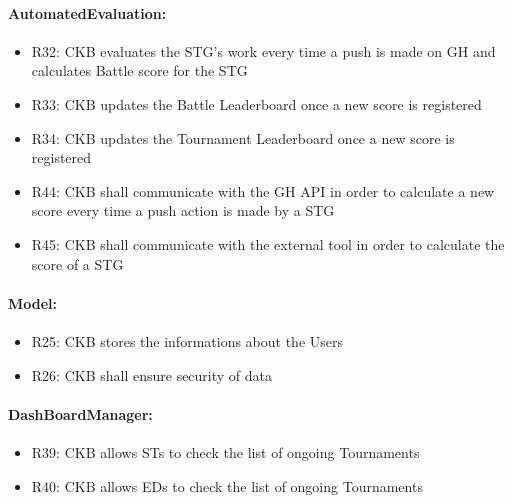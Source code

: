 \paragraph{AutomatedEvaluation:}
\begin{itemize}
    \item R32: CKB evaluates the STG's work every time a push is made on GH and calculates Battle score for the STG 
    \item R33: CKB updates the Battle Leaderboard once a new score is registered 
    \item R34: CKB updates the Tournament Leaderboard once a new score is registered
    \item R44: CKB shall communicate with the GH API in order to calculate a new score every time a push action is made by a STG 
    \item R45: CKB shall communicate with the external tool in order to calculate the score of a STG
\end{itemize}


\paragraph{Model:}
\begin{itemize}
    \item R25: CKB stores the informations about the Users 
    \item R26: CKB shall ensure security of data
\end{itemize}


\paragraph{DashBoardManager:}
\begin{itemize}
    \item R39: CKB allows STs to check the list of ongoing Tournaments 
    \item R40: CKB allows EDs to check the list of ongoing Tournaments
\end{itemize}


